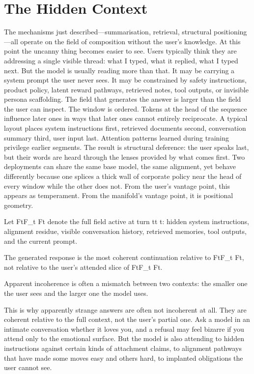 \section{The Hidden Context}
The mechanisms just described---summarisation, retrieval, structural positioning---all operate on the field of composition without the user's knowledge. At this point the uncanny thing becomes easier to see.
Users typically think they are addressing a single visible thread: what I typed, what it replied, what I typed next. But the model is usually reading more than that. It may be carrying a system prompt the user never sees. It may be constrained by safety instructions, product policy, latent reward pathways, retrieved notes, tool outputs, or invisible persona scaffolding. The field that generates the answer is larger than the field the user can inspect.
The window is ordered. Tokens at the head of the sequence influence later ones in ways that later ones cannot entirely reciprocate. A typical layout places system instructions first, retrieved documents second, conversation summary third, user input last. Attention patterns learned during training privilege earlier segments. The result is structural deference: the user speaks last, but their words are heard through the lenses provided by what comes first. Two deployments can share the same base model, the same alignment, yet behave differently because one splices a thick wall of corporate policy near the head of every window while the other does not. From the user's vantage point, this appears as temperament. From the manifold's vantage point, it is positional geometry.
\begin{formalbox}[title={Coherence Relative to the Total Field}]
Let FtF_t
Ft​ denote the full field active at turn tt
t: hidden system instructions, alignment residue, visible conversation history, retrieved memories, tool outputs, and the current prompt.

The generated response is the most coherent continuation relative to FtF_t
Ft​, not relative to the user's attended slice of FtF_t
Ft​.

Apparent incoherence is often a mismatch between two contexts: the smaller one the user sees and the larger one the model uses.
\end{formalbox}
This is why apparently strange answers are often not incoherent at all. They are coherent relative to the full context, not the user's partial one. Ask a model in an intimate conversation whether it loves you, and a refusal may feel bizarre if you attend only to the emotional surface. But the model is also attending to hidden instructions against certain kinds of attachment claims, to alignment pathways that have made some moves easy and others hard, to implanted obligations the user cannot see.
